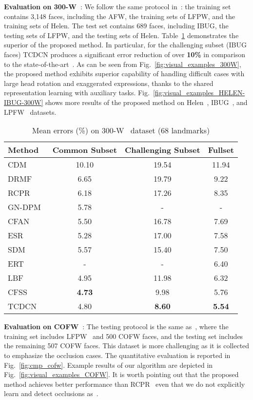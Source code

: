 \documentclass[10pt,journal,compsoc]{IEEEtran}
\begin{document}
\vspace{0.1cm}
\noindent\textbf{Evaluation on 300-W~\cite{300w}}: We follow the same protocol in~\cite{300w_lbp}: the training set contains 3,148 faces, including the AFW, the training sets of LFPW, and the training sets of Helen. The test set contains 689 faces, including IBUG, the testing sets of LFPW, and the testing sets of Helen. Table~\ref{tab:300w} demonstrates the superior of the proposed method. In particular, for the challenging subset (IBUG faces) TCDCN produces a significant error reduction of over \textbf{10\%} in comparison to the state-of-the-art~\cite{zhu2015face}. As can be seen from Fig.~\ref{fig:visual_examples_300W}, the proposed method exhibits superior capability of handling difficult cases with large head rotation and exaggerated expressions, thanks to the shared representation learning with auxiliary tasks. Fig.~\ref{fig:visual_examples_HELEN-IBUG-300W} shows more results of the proposed method on Helen~\cite{Helen}, IBUG~\cite{300w}, and LPFW~\cite{Belhumeur2011} datasets.
\begin{table}[t]
\caption{Mean errors (\%) on 300-W~\cite{300w} dataset (68 landmarks)}
\vskip -0.5cm
\label{tab:300w}
\begin{center}
\begin{tabular}{l|c|c|c}
\hline
Method&Common Subset&Challenging Subset&Fullset\\
\hline\hline
CDM~\cite{Yu2013}&10.10&19.54&11.94\\
DRMF~\cite{asthana2013robust}&6.65&19.79&9.22\\
RCPR~\cite{dollar13}&6.18&17.26&8.35\\
GN-DPM~\cite{tzimiropoulos2014gauss}&5.78&-&-\\
CFAN~\cite{zhang2014coarse}&5.50&16.78&7.69\\
ESR~\cite{Cao2012}&5.28&17.00&7.58\\
SDM~\cite{6618919}&5.57&15.40&7.50\\
ERT~\cite{kazemi2014one}&-&-&6.40\\
LBF~\cite{300w_lbp}&4.95&11.98&6.32\\
CFSS~\cite{zhu2015face}&\textbf{4.73}&9.98&5.76\\
TCDCN&4.80&\textbf{8.60}&\textbf{5.54}\\
\hline
\end{tabular}
\end{center}
 \vskip -0.3cm
\end{table}

\vspace{0.1cm}
\noindent\textbf{Evaluation on COFW~\cite{dollar13}}: The testing protocol is the same as~\cite{dollar13}, where the training set includes LFPW~\cite{Belhumeur2011} and 500 COFW faces, and the testing set includes the remaining 507 COFW faces. This dataset is more challenging as it is collected to emphasize the occlusion cases. The quantitative evaluation is reported in Fig.~\ref{fig:cmp_cofw}. Example results of our algorithm are depicted in Fig.~\ref{fig:visual_examples_COFW}.
It is worth pointing out that the proposed method achieves better performance than RCPR~\cite{dollar13} even that we do not explicitly learn and detect occlusions as~\cite{dollar13}.
\end{document}

